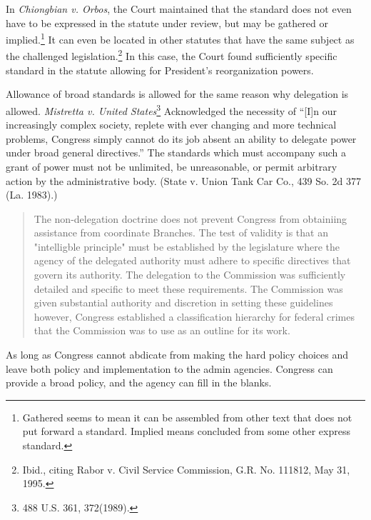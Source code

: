 \documentclass[../main.tex]{subfiles}
\begin{document}
In \textit{Chiongbian v. Orbos}, the Court maintained that the standard does not even have to be expressed in the statute under review, but may be gathered or implied.\footnote{Gathered seems to mean it can be assembled from other text that does not put forward a standard. Implied means concluded from some other express standard.} It can even be located in other statutes that have the same subject as the challenged legislation.\footnote{Ibid., citing Rabor v. Civil Service Commission, G.R. No. 111812, May 31, 1995.} In this case, the Court found sufficiently specific standard in the statute allowing for President's reorganization powers.


Allowance of broad standards is allowed for the same reason why delegation is allowed. \textit{Mistretta v. United States}\footnote{488 U.S. 361, 372(1989).} Acknowledged the necessity of “[I]n our increasingly complex society, replete with ever changing and more technical problems, Congress simply cannot do its job absent an ability to delegate power under broad general directives.” The standards which must accompany such a grant of power must not be unlimited, be unreasonable, or permit arbitrary action by the administrative body. (State v. Union Tank Car Co., 439 So. 2d 377 (La. 1983).)


\begin{quote}
The non-delegation doctrine does not prevent Congress from obtainiing assistance from coordinate Branches. The test of validity is that an "intelligble principle" must be established by the legislature where the agency of the delegated authority must adhere to specific directives that govern its authority. The delegation to the Commission was sufficiently detailed and specific to meet these requirements. The Commission was given substantial authority and discretion in setting these guidelines however, Congress established a classification hierarchy for federal crimes that the Commission was to use as an outline for its work.
\end{quote}


As long as Congress cannot abdicate from making the hard policy choices and leave both policy and implementation to the admin agencies. Congress can provide a broad policy, and the agency can fill in the blanks.
\end{document}
